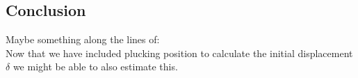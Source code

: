 \documentclass{article}
\begin{document}
\begin{sloppy}
\section{Conclusion}
Maybe something along the lines of:\\
Now that we have included plucking position to calculate the initial displacement $\delta$ we might be able to also estimate this. 
%


%
% 
%
%
%
% 
%
% 
% 


\end{sloppy}
\end{document}
